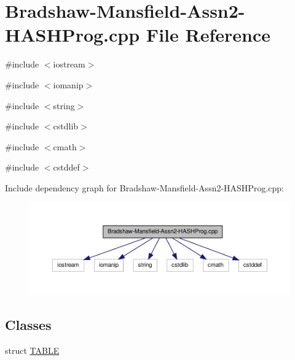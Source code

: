 \hypertarget{_bradshaw-_mansfield-_assn2-_h_a_s_h_prog_8cpp}{
\section{Bradshaw-\/Mansfield-\/Assn2-\/HASHProg.cpp File Reference}
\label{_bradshaw-_mansfield-_assn2-_h_a_s_h_prog_8cpp}
}
{\ttfamily \#include $<$iostream$>$}\par
{\ttfamily \#include $<$iomanip$>$}\par
{\ttfamily \#include $<$string$>$}\par
{\ttfamily \#include $<$cstdlib$>$}\par
{\ttfamily \#include $<$cmath$>$}\par
{\ttfamily \#include $<$cstddef$>$}\par
Include dependency graph for Bradshaw-\/Mansfield-\/Assn2-\/HASHProg.cpp:\nopagebreak
\begin{figure}[H]
\begin{center}
\leavevmode
\includegraphics[width=400pt]{_bradshaw-_mansfield-_assn2-_h_a_s_h_prog_8cpp__incl}
\end{center}
\end{figure}
\subsection*{Classes}
\begin{DoxyCompactItemize}
\item 
struct \hyperlink{struct_t_a_b_l_e}{TABLE}
\end{DoxyCompactItemize}
